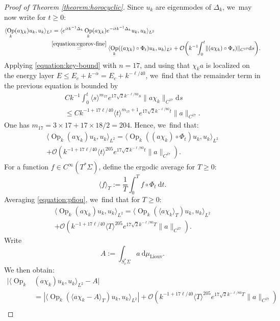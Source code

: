 \documentclass[10pt]{amsart}
\theoremstyle{plain}
\theoremstyle{definition}
\let\mc\mathcal
\newcommand{\dd}{\mathrm{d}}
\DeclareMathOperator{\Op}{Op}
\begin{document}
\begin{proof}[Proof of Theorem \ref{theorem:horocyclic}]
Since $u_k$ are eigenmodes of $\Delta_k$, we~may now write for $t \geq 0$:
\begin{align*}
\langle \Op_k(a \chi_k) u_k,u_k\rangle_{L^2} &= \langle e^{itk^{-1}\Delta_k} \Op_k(a \chi_k) e^{-itk^{-1}\Delta_k}u_k,u_k\rangle_{L^2} \\
& \mkern-7mu\overset{\eqref{equation:egorov-fine}}{=} \langle \Op_k((a \chi_k) \circ \Phi_t) u_k, u_k \rangle_{L^2}+ \mc{O}\biggl(k^{-1} \!\!\int_0^t\! \|(a \chi_k) \circ \Phi_s)\|_{C^{17}} \dd s\biggr).
\end{align*}
Applying \eqref{equation:key-bound} with $n=17$, and using that $\chi_k a$ is localized on the energy layer $E \leq E_c + k^{-\alpha} = E_c + k^{-\ell/40}$, we~find that the remainder term in the previous equation is bounded by
\begin{multline}
\label{equation:dingo}
C k^{-1} \int_0^t \langle s \rangle^{m_{17}} e^{17 \sqrt{2}k^{-\ell/80} s} \|a \chi_k\|_{C^{17}} \dd s\\
\leq C k^{-1+17\ell/40} \langle t\rangle^{m_{17}+1} e^{17\sqrt{2}k^{-\ell/80} t} \|a\|_{C^{17}}.
\end{multline}
One has $m_{17} = 3 \times 17+ 17\times 18/2 = 204$. Hence, we~find that:
\begin{multline}
\label{equation:pfiou}
\langle \Op_k(a \chi_k) u_k,u_k\rangle_{L^2} = \langle \Op_k((a \chi_k) \circ \Phi_t) u_k, u_k \rangle_{L^2} \\
+ \mc{O}(k^{-1+17\ell/40} \langle t\rangle^{205} e^{17\sqrt{2}k^{-\ell/80} t} \|a\|_{C^{17}}).
\end{multline}
For a function $f \in C^\infty(T^*\Sigma)$, define the ergodic average for $T \geq 0$:
\[
\langle f \rangle_T := \dfrac{1}{T} \int_0^T f \circ \Phi_t ~\dd t.
\]
Averaging \eqref{equation:pfiou}, we~find that for $T \geq 0$:
\begin{multline*}
\langle \Op_k(a \chi_k) u_k,u_k\rangle_{L^2} = \langle \Op_k(\langle a \chi_k\rangle_T) u_k, u_k \rangle_{L^2} \\
+ \mc{O}(k^{-1+17\ell/40} \langle T\rangle^{205} e^{17\sqrt{2}k^{-\ell/80} T} \|a\|_{C^{17}}).
\end{multline*}
Write
\[
A := \int_{S^*_c\Sigma} a~ \dd \mu_{\mathrm{Liouv}}.
\]
We then obtain:
\[
\begin{split}
|\langle \Op_k&(a \chi_k) u_k,u_k\rangle_{L^2} - A| \\
&= |\langle \Op_k\left(\langle a \chi_k- A\rangle_T\right) u_k, u_k \rangle_{L^2}| + \mc{O}(k^{-1+17\ell/40} \langle T\rangle^{205} e^{17\sqrt{2}k^{-\ell/80} T} \|a\|_{C^{17}}) \\

\end{split}\]
\end{proof}
\end{document}

